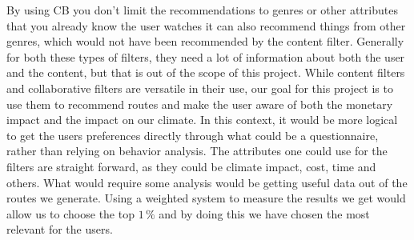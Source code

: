 By using CB you don't limit the recommendations to genres or other attributes that you already know the user watches it
can also recommend things from other genres, which would not have been recommended by the content filter.\newline
Generally for both these types of filters, they need a lot of information about both the user and the content, but that
is out of the scope of this project.
While content filters and collaborative filters are versatile in their use, our goal for this project is to use them to
recommend routes and make the user aware of both the monetary impact and the impact on our climate.
In this context, it would be more logical to get the users preferences directly through what could be a questionnaire,
rather than relying on behavior analysis.
The attributes one could use for the filters are straight forward, as they could be climate impact, cost, time and
others.
What would require some analysis would be getting useful data out of the routes we generate.
Using a weighted system to measure the results we get would allow us to choose the top \(1\,\%\) and by doing this we
have chosen the most relevant for the users.
